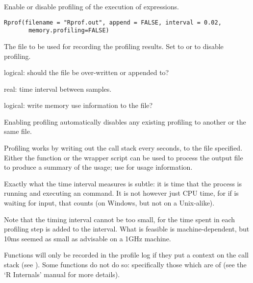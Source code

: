 %
\begin{Description}\relax
Enable or disable profiling of the execution of \R{} expressions.
\end{Description}
%
\begin{Usage}
\begin{verbatim}
Rprof(filename = "Rprof.out", append = FALSE, interval = 0.02,
       memory.profiling=FALSE)
\end{verbatim}
\end{Usage}
%
\begin{Arguments}
\begin{ldescription}
\item[\code{filename}] 
The file to be used for recording the profiling results.
Set to  or  to disable profiling.

\item[\code{append}] 
logical: should the file be over-written or appended to?

\item[\code{interval}] 
real: time interval between samples.

\item[\code{memory.profiling}] logical: write memory use information to the file?
\end{ldescription}
\end{Arguments}
%
\begin{Details}\relax
Enabling profiling automatically disables any existing profiling to
another or the same file.

Profiling works by writing out the call stack every 
seconds, to the file specified.  Either the 
function or the wrapper script  can be used to
process the output file to produce a summary of the usage; use
 for usage information.

Exactly what the time interval measures is subtle: it is time that the
\R{} process is running and executing an \R{} command.  It is not however just
CPU time, for if  is waiting for input, that counts
(on Windows, but not on a Unix-alike).

Note that the timing interval cannot be too small, for the time spent
in each profiling step is added to the interval.  What is feasible is
machine-dependent, but 10ms seemed as small as advisable on a 1GHz machine.

Functions will only be recorded in the profile log if they put a
context on the call stack (see ).  Some
 functions do not do so: specifically those which are
of   (see the `R Internals' manual
for more details).
\end{Details}
